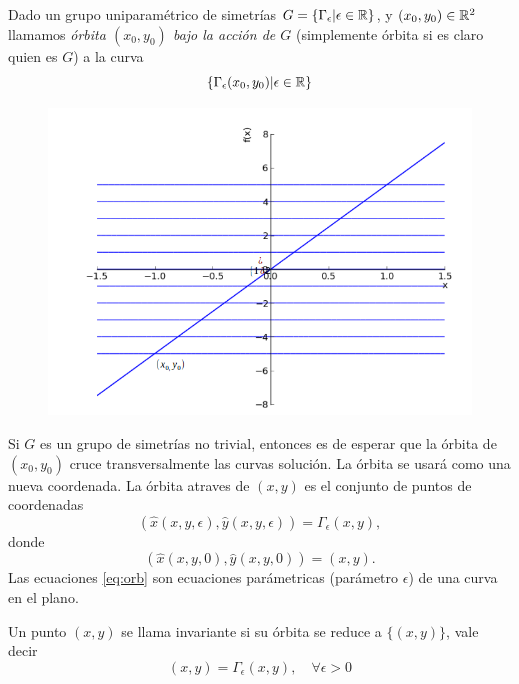 \begin{definicion}[Órbitas] Dado un grupo uniparamétrico de simetrías $G=\{\Gamma_{\epsilon}|\epsilon\in\rr\}$, y $(x_0,y_0)\in\rr^2$ llamamos \emph{órbita $(x_0,y_0)$ bajo la acción de  $G$} (simplemente órbita si es claro quien es $G$) a la curva
\[\{\Gamma_{\epsilon}(x_0,y_0)|\epsilon\in\rr\} \]
\end{definicion}

\begin{figure}
\includegraphics[scale=.3]{imagenes/sol_trivialB.png}
\end{figure}
Si $G$ es un grupo de simetrías no trivial, entonces es de esperar que la órbita de  $(x_0,y_0)$ cruce transversalmente las curvas solución. La órbita se usará como una nueva coordenada.
 La órbita atraves de $(x,y)$ es el conjunto de puntos de coordenadas
\begin{equation}\label{eq:orb} (\hat{x}(x,y,\epsilon),\hat{y}(x,y,\epsilon))=\Gamma_{\epsilon}(x,y),
\end{equation}
donde
\[(\hat{x}(x,y,0),\hat{y}(x,y,0))=(x,y).\]
Las ecuaciones \eqref{eq:orb} son ecuaciones parámetricas (parámetro $\epsilon$) de una  curva en el plano.

\begin{definicion}
Un punto $(x,y)$ se llama invariante si su órbita se reduce a $\{(x,y)\}$, vale decir
\[(x,y)=\Gamma_{\epsilon}(x,y),\quad\forall \epsilon>0\]
\end{definicion}






